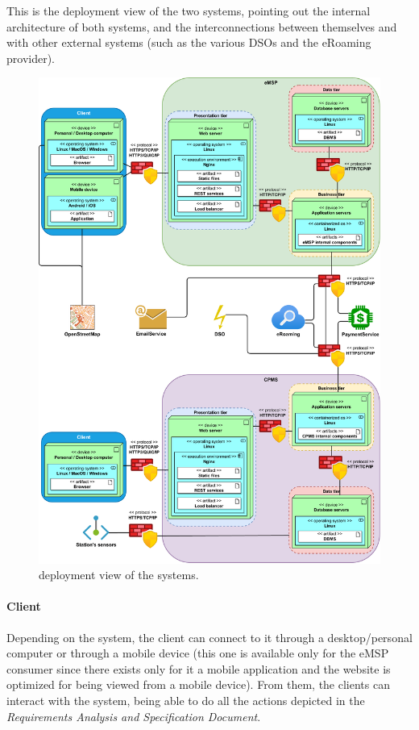 This is the deployment view of the two systems, pointing out the internal architecture of both systems, and the interconnections between themselves and with other external systems (such as the various DSOs and the eRoaming provider).

\begin{figure}[h!]
    \centering
    \includegraphics[width=0.93\columnwidth]{./images/deployment}
    \caption{deployment view of the systems.}
\end{figure}

\paragraph{Client} Depending on the system, the client can connect to it through a desktop/personal computer or through a mobile device (this one is available only for the eMSP consumer since there exists only for it a mobile application and the website is optimized for being viewed from a mobile device). From them, the clients can interact with the system, being able to do all the actions depicted in the \textit{Requirements Analysis and Specification Document}.

